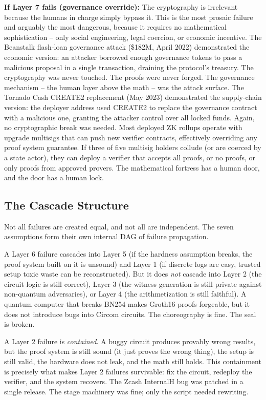 \documentclass[
  11pt,
  openany]{report}
\renewcommand{\textbf}[1]{{\bfseries\color{MidnightBold}#1}}
\begin{document}
\textbf{If Layer 7 fails (governance override):} The cryptography is irrelevant
because the humans in charge simply bypass it. This is the most prosaic failure
and arguably the most dangerous, because it requires no mathematical
sophistication -- only social engineering, legal coercion, or economic
incentive. The Beanstalk flash-loan governance attack (\$182M, April 2022)
demonstrated the economic version: an attacker borrowed enough governance tokens
to pass a malicious proposal in a single transaction, draining the protocol's
treasury. The cryptography was never touched. The proofs were never forged. The
governance mechanism -- the human layer above the math -- was the attack
surface. The Tornado Cash CREATE2 replacement (May 2023) demonstrated the
supply-chain version: the deployer address used CREATE2 to replace the
governance contract with a malicious one, granting the attacker control over all
locked funds. Again, no cryptographic break was needed. Most deployed ZK rollups
operate with upgrade multisigs that can push new verifier contracts, effectively
overriding any proof system guarantee. If three of five multisig holders collude
(or are coerced by a state actor), they can deploy a verifier that accepts all
proofs, or no proofs, or only proofs from approved provers. The mathematical
fortress has a human door, and the door has a human lock.

\subsection{The Cascade Structure}\label{the-cascade-structure}

Not all failures are created equal, and not all are independent. The seven
assumptions form their own internal DAG of failure propagation.

A Layer 6 failure cascades into Layer 5 (if the hardness assumption breaks, the
proof system built on it is unsound) and Layer 1 (if discrete logs are easy,
trusted setup toxic waste can be reconstructed). But it does \emph{not} cascade
into Layer 2 (the circuit logic is still correct), Layer 3 (the witness
generation is still private against non-quantum adversaries), or Layer 4 (the
arithmetization is still faithful). A quantum computer that breaks BN254 makes
Groth16 proofs forgeable, but it does not introduce bugs into Circom circuits.
The choreography is fine. The seal is broken.

A Layer 2 failure is \emph{contained}. A buggy circuit produces provably wrong
results, but the proof system is still sound (it just proves the wrong thing),
the setup is still valid, the hardware does not leak, and the math still holds.
This containment is precisely what makes Layer 2 failures survivable: fix the
circuit, redeploy the verifier, and the system recovers. The Zcash InternalH bug
was patched in a single release. The stage machinery was fine; only the script
needed rewriting.
\end{document}
